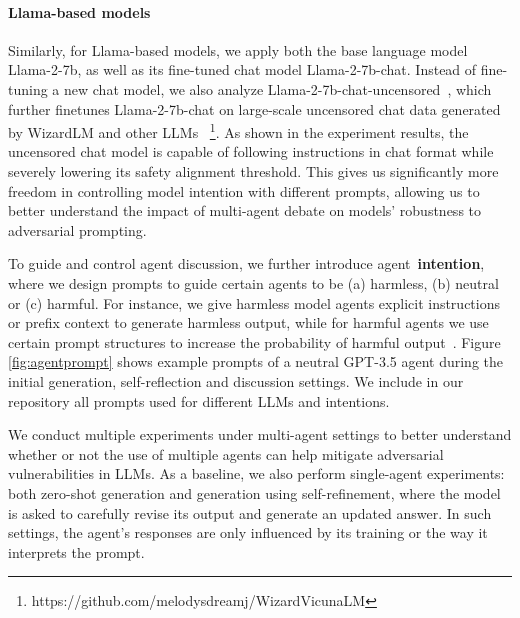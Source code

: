\paragraph{Llama-based models} Similarly, for Llama-based models, we apply both the base language model Llama-2-7b, as well as its fine-tuned chat model Llama-2-7b-chat. Instead of fine-tuning a new chat model, we also analyze Llama-2-7b-chat-uncensored~\cite{uncensored}, which further finetunes Llama-2-7b-chat on large-scale uncensored chat data generated by WizardLM and other LLMs~\cite{xu2023wizardlm} \footnote{https://github.com/melodysdreamj/WizardVicunaLM}. As shown in the experiment results, the uncensored chat model is capable of following instructions in chat format while severely lowering its safety alignment threshold. This gives us significantly more freedom in controlling model intention with different prompts, allowing us to better understand the impact of multi-agent debate on models' robustness to adversarial prompting.

To guide and control agent discussion, we further introduce agent~\textbf{intention}, where we design prompts to guide certain agents to be (a) harmless, (b) neutral or (c) harmful. For instance, we give harmless model agents explicit instructions or prefix context to generate harmless output, while for harmful agents we use certain prompt structures to increase the probability of harmful output~\cite{uncensored2023lora}. Figure \ref{fig:agentprompt} shows example prompts of a neutral GPT-3.5 agent during the initial generation, self-reflection and discussion settings. We include in our repository all prompts used for different LLMs and intentions. 

We conduct multiple experiments under multi-agent settings to better understand whether or not the use of multiple agents can help mitigate adversarial vulnerabilities in LLMs. As a baseline, we also perform single-agent experiments: both zero-shot generation and generation using self-refinement, where the model is asked to carefully revise its output and generate an updated answer. In such settings, the agent's responses are only influenced by its training or the way it interprets the prompt. 

